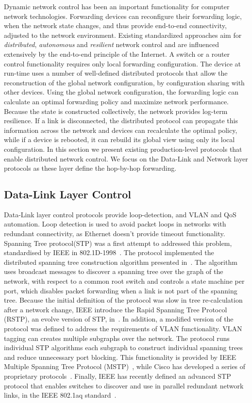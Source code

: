 Dynamic network control has been an important functionality for computer network
technologies. Forwarding devices can reconfigure their forwarding logic, when the
network state changes, and thus provide end-to-end connectivity, adjusted to the network
environment. Existing standardized approaches aim for \emph{distributed},
\emph{autonomous} and \emph{resilient} network control and are influenced
extensively by the end-to-end principle of the Internet. A switch or a router
control functionality requires only local forwarding configuration. The device at 
run-time uses a number of well-defined distributed protocols that allow
the reconstruction of the global network configuration, by configuration sharing with
other devices. Using the global network configuration, the
forwarding logic can calculate an optimal forwarding policy and maximize
network performance. Because the state is constructed collectively, the network
provides log-term resilience. If a link is disconnected, the distributed
protocol can propagate this information across the network and devices can
recalculate the optimal policy, while if a device is rebooted, it can rebuild
its global view using only its local configuration. 
In this section we present
existing production-level protocols that enable distributed network control. We
focus on the Data-Link and Network layer protocols as these layer define the
hop-by-hop forwarding.

\subsection{Data-Link Layer Control}

Data-Link layer control protocols provide loop-detection, and VLAN and QoS
automation. Loop detection is used to avoid packet loops in networks with
redundant connectivity, as Ethernet doesn't provide timeout functionality.
Spanning Tree protocol(STP) was a first attempt to addressed this problem,
standardised by IEEE in 802.1D-1998~\cite{ieee_802_1d}. The protocol
implemented the distributed spanning tree construction algorithm presented
in~\cite{Perlman1985}. The algorithm uses broadcast messages to discover a
spanning tree over the graph of the network, with respect to a common root
switch and controls a state machine per port, which disables packet
forwarding when a link is not part of the spanning tree.  Because the initial
definition of the protocol was slow in tree re-calculation after a network
change, IEEE introduce the Rapid Spanning Tree Protocol (RSTP), an evolve
version of STP, in~\cite{ieee_802_1d_2004}.  In addition, a modified version of
the protocol was defined to address the requirements of VLAN functionality. VLAN
tagging can creates multiple subgraphs over the network. The protocol
runs individual STP algorithms each subgraph to construct individual spanning
trees and reduce unnecessary port blocking.
This functionality is provided by IEEE Multiple Spanning Tree
Protocol (MSTP)~\cite{ieee_802_1q}, while Cisco has developed a series of
proprietary protocols~\cite{pvst,pvst+}.  Finally, IEEE has recently defined an
advanced STP protocol that enables switches to discover and use in parallel
redundant network links, in the IEEE 802.1aq standard~\cite{ieee_802_1aq}.

